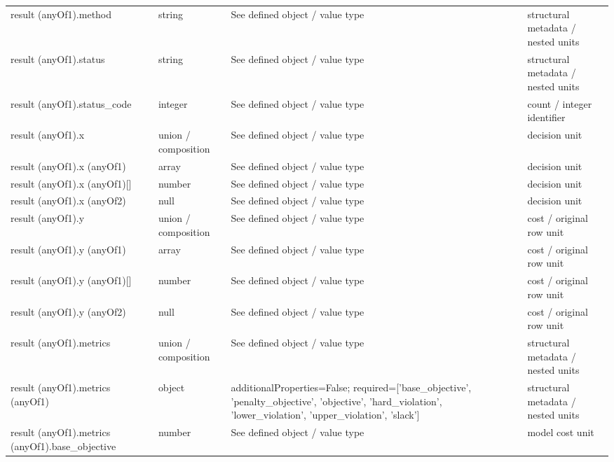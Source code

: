 \begin{longtable}{@{}>{\raggedright\arraybackslash}p{}>{\raggedright\arraybackslash}p{}>{\raggedright\arraybackslash}p{}>{\raggedright\arraybackslash}p{}@{}}
result (anyOf1).\allowbreak{}method & string & See defined object /\allowbreak{} value type & structural metadata /\allowbreak{} nested units\\
result (anyOf1).\allowbreak{}status & string & See defined object /\allowbreak{} value type & structural metadata /\allowbreak{} nested units\\
result (anyOf1).\allowbreak{}status\_\allowbreak{}code & integer & See defined object /\allowbreak{} value type & count /\allowbreak{} integer identifier\\
result (anyOf1).\allowbreak{}x & union /\allowbreak{} composition & See defined object /\allowbreak{} value type & decision unit\\
result (anyOf1).\allowbreak{}x (anyOf1) & array & See defined object /\allowbreak{} value type & decision unit\\
result (anyOf1).\allowbreak{}x (anyOf1)[] & number & See defined object /\allowbreak{} value type & decision unit\\
result (anyOf1).\allowbreak{}x (anyOf2) & null & See defined object /\allowbreak{} value type & decision unit\\
result (anyOf1).\allowbreak{}y & union /\allowbreak{} composition & See defined object /\allowbreak{} value type & cost /\allowbreak{} original row unit\\
result (anyOf1).\allowbreak{}y (anyOf1) & array & See defined object /\allowbreak{} value type & cost /\allowbreak{} original row unit\\
result (anyOf1).\allowbreak{}y (anyOf1)[] & number & See defined object /\allowbreak{} value type & cost /\allowbreak{} original row unit\\
result (anyOf1).\allowbreak{}y (anyOf2) & null & See defined object /\allowbreak{} value type & cost /\allowbreak{} original row unit\\
result (anyOf1).\allowbreak{}metrics & union /\allowbreak{} composition & See defined object /\allowbreak{} value type & structural metadata /\allowbreak{} nested units\\
result (anyOf1).\allowbreak{}metrics (anyOf1) & object & additionalProperties=\allowbreak{}False; required=\allowbreak{}['base\_\allowbreak{}objective', 'penalty\_\allowbreak{}objective', 'objective', 'hard\_\allowbreak{}violation', 'lower\_\allowbreak{}violation', 'upper\_\allowbreak{}violation', 'slack'] & structural metadata /\allowbreak{} nested units\\
result (anyOf1).\allowbreak{}metrics (anyOf1).\allowbreak{}base\_\allowbreak{}objective & number & See defined object /\allowbreak{} value type & model cost unit\\

\end{longtable}
